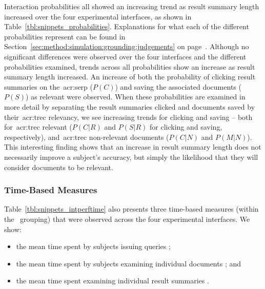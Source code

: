 Interaction probabilities all showed an increasing trend as result summary length increased over the four experimental interfaces, as shown in Table~\ref{tbl:snippets_probabilities}. Explanations for what each of the different probabilities represent can be found in Section~\ref{sec:method:simulation:grounding:judgements} on page~\pageref{sec:method:simulation:grounding:judgements}. Although no significant differences were observed over the four interfaces and the different probabilities examined, trends across all probabilities show an increase as result summary length increased. An increase of both the probability of clicking result summaries on the~\gls{acr:serp} ($P(C)$) and saving the associated documents ($P(S)$) as relevant were observed. When these probabilities are examined in more detail by separating the result summaries clicked and documents saved by their~\gls{acr:trec} relevancy, we see increasing trends for clicking and saving -- both for~\gls{acr:trec} relevant ($P(C|R)$ and $P(S|R)$ for clicking and saving, respectively), and~\gls{acr:trec} non-relevant documents ($P(C|N)$ and $P(M|N)$). This interesting finding shows that an increase in result summary length does not necessarily improve a subject's accuracy, but simply the likelihood that they will consider documents to be relevant.


\subsubsection{Time-Based Measures}\label{chap:snippets:user:results:time}
Table~\ref{tbl:snippets_intperftime} also presents three time-based measures (within the ~grouping) that were observed across the four experimental interfaces. We show:

\begin{itemize}
    \item{the mean time spent by subjects issuing queries ;}
    \item{the mean time spent by subjects examining individual documents ; and}
    \item{the mean time spent examining individual result summaries .}
\end{itemize}

